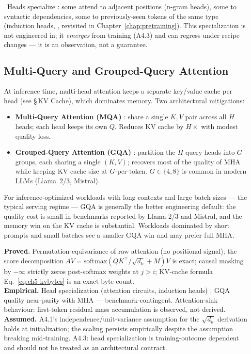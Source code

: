 \Emp\ Heads specialize \citep{elhage2021mathematical}: some attend to
adjacent positions (n-gram heads), some to syntactic dependencies,
some to previously-seen tokens of the same type (induction heads,
\citealt{olsson2022induction}, revisited in Chapter~\ref{chap:pretraining}). This
specialization is not engineered in; it \emph{emerges} from training
(A4.3) and can regress under recipe changes --- it is an observation,
not a guarantee.

\subsection{Multi-Query and Grouped-Query Attention}

At inference time, multi-head attention keeps a separate key/value
cache per head (see \S\,KV Cache), which dominates memory. Two
architectural mitigations:
\begin{itemize}
  \item \textbf{Multi-Query Attention (MQA)} \citep{shazeer2019fast}:
        share a single $K, V$ pair across all $H$ heads; each head
        keeps its own $Q$. Reduces KV cache by $H\times$ with modest
        quality loss.
  \item \textbf{Grouped-Query Attention (GQA)}
        \citep{ainslie2023gqa}: partition the $H$ query heads into
        $G$ groups, each sharing a single $(K, V)$; recovers most of
        the quality of MHA while keeping KV cache size at $G$-per-token.
        $G \in \{4, 8\}$ is common in modern LLMs (Llama~2/3, Mistral).
\end{itemize}
For inference-optimized workloads with long contexts and large
batch sizes --- the typical serving regime --- GQA is generally
the better engineering default: the quality cost is small in
benchmarks reported by Llama-2/3 and Mistral, and the memory win
on the KV cache is substantial. Workloads dominated by short
prompts and small batches see a smaller GQA win and may prefer
full MHA.

\begin{provedassumed}
\textbf{Proved.} Permutation-equivariance of raw attention (no
positional signal); the score decomposition
$A V = \mathrm{softmax}(QK^{\top}/\sqrt{d_k} + M) V$ is exact;
causal masking by $-\infty$ strictly zeros post-softmax weights at
$j > i$; KV-cache formula Eq.~\eqref{eq:ch5-kvbytes} is an exact
byte count. \\
\textbf{Empirical.} Head specialization (attention circuits,
induction heads) \citep{elhage2021mathematical, olsson2022induction}.
GQA quality near-parity with MHA \citep{ainslie2023gqa} ---
benchmark-contingent. Attention-sink behaviour: first-token
residual mass accumulation is observed, not derived. \\
\textbf{Assumed.} A4.1's independence/unit-variance assumption for
the $\sqrt{d_k}$ derivation holds at initialization; the scaling
persists empirically despite the assumption breaking mid-training.
A4.3: head specialization is training-outcome dependent and should
not be treated as an architectural contract.
\end{provedassumed}

